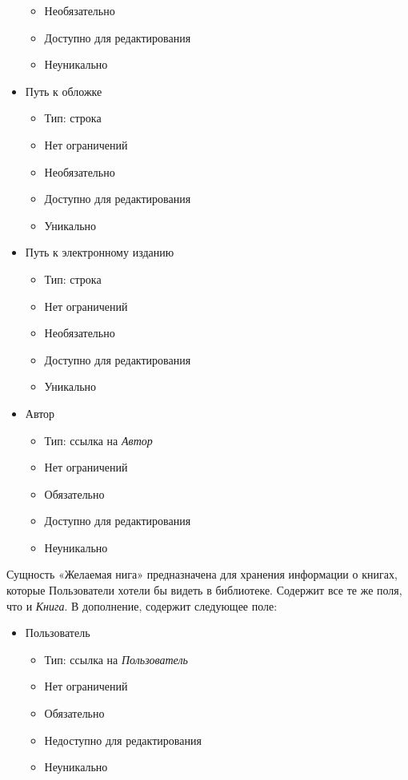 \documentclass[data-specification.tex]{subfiles}
\begin{document}
\begin{itemize}
\begin{itemize}
        \item Необязательно
        \item Доступно для редактирования
        \item Неуникально
    \end{itemize}
    \item Путь к обложке
    \begin{itemize}
        \item Тип: строка
        \item Нет ограничений
        \item Необязательно
        \item Доступно для редактирования
        \item Уникально
    \end{itemize}
    \item Путь к электронному изданию
    \begin{itemize}
        \item Тип: строка
        \item Нет ограничений
        \item Необязательно
        \item Доступно для редактирования
        \item Уникально
    \end{itemize}
    \item Автор
    \begin{itemize}
        \item Тип: ссылка на \textsl{Автор}
        \item Нет ограничений
        \item Обязательно
        \item Доступно для редактирования
        \item Неуникально
    \end{itemize}
\end{itemize}
\par
Сущность «Желаемая нига» предназначена для хранения информации о книгах, которые Пользователи хотели бы видеть в библиотеке. Содержит все те же поля, что и \textsl{Книга}. В дополнение, содержит следующее поле:
\begin{itemize}
    \item Пользователь
    \begin{itemize}
        \item Тип: ссылка на \textsl{Пользователь}
        \item Нет ограничений
        \item Обязательно
        \item Недоступно для редактирования
        \item Неуникально
    \end{itemize}
\end{itemize}
\end{document}
